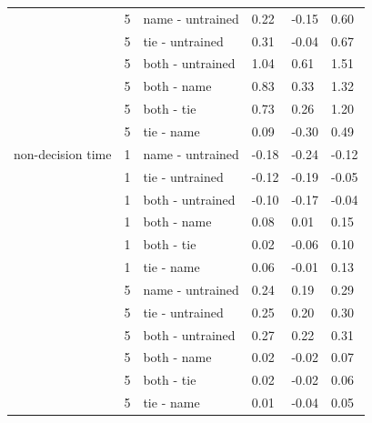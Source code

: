 \documentclass[
  english,
  man,floatsintext]{apa6}
\begin{document}
\begin{center}
\begin{ThreePartTable}
\begin{longtable}{llllll}
 & 5 & name - untrained & 0.22 & -0.15 & 0.60\\
 & 5 & tie - untrained & 0.31 & -0.04 & 0.67\\
 & 5 & both - untrained & 1.04 & 0.61 & 1.51\\
 & 5 & both - name & 0.83 & 0.33 & 1.32\\
 & 5 & both - tie & 0.73 & 0.26 & 1.20\\
 & 5 & tie - name & 0.09 & -0.30 & 0.49\\
non-decision time & 1 & name - untrained & -0.18 & -0.24 & -0.12\\
 & 1 & tie - untrained & -0.12 & -0.19 & -0.05\\
 & 1 & both - untrained & -0.10 & -0.17 & -0.04\\
 & 1 & both - name & 0.08 & 0.01 & 0.15\\
 & 1 & both - tie & 0.02 & -0.06 & 0.10\\
 & 1 & tie - name & 0.06 & -0.01 & 0.13\\
 & 5 & name - untrained & 0.24 & 0.19 & 0.29\\
 & 5 & tie - untrained & 0.25 & 0.20 & 0.30\\
 & 5 & both - untrained & 0.27 & 0.22 & 0.31\\
 & 5 & both - name & 0.02 & -0.02 & 0.07\\
 & 5 & both - tie & 0.02 & -0.02 & 0.06\\
 & 5 & tie - name & 0.01 & -0.04 & 0.05\\
\bottomrule
\end{longtable}

\end{ThreePartTable}
\end{center}
\end{document}
